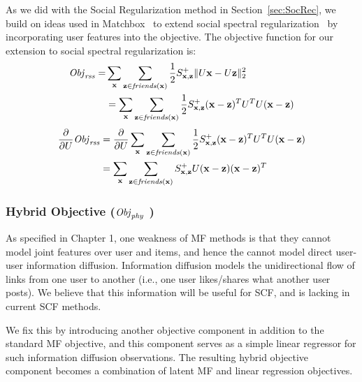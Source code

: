 As we did with the Social Regularization method in
Section~\ref{sec:SocRec}, we build on ideas used in
Matchbox~\cite{matchbox} to extend social spectral
regularization~\cite{sr,rrmf} by incorporating user features into the
objective. The objective function for our extension to social spectral
regularization is:
\begin{align}
\mathit{Obj}_{\mathit{rss}} = & \sum_{\mathbf{x}} \sum_{\mathbf{z} \in \mathit{friends}(\mathbf{x})} \frac{1}{2} S^+_{\mathbf{x},\mathbf{z}} \| U\mathbf{x} - U\mathbf{z} \|_2^2 \\
& = \sum_{\mathbf{x}} \sum_{\mathbf{z} \in \mathit{friends}(\mathbf{x})} \frac{1}{2} S^+_{\mathbf{x},\mathbf{z}} (\mathbf{x} - \mathbf{z})^T U^T U (\mathbf{x} - \mathbf{z}) \nonumber
\end{align}
\begin{align}
\frac{\partial}{\partial U} \mathit{Obj}_{\mathit{rss}} & = \frac{\partial}{\partial U} \sum_{\mathbf{x}} \sum_{\mathbf{z} \in \mathit{friends}(\mathbf{x})} \frac{1}{2} S^+_{\mathbf{x},\mathbf{z}} (\mathbf{x} - \mathbf{z})^T U^T U (\mathbf{x} - \mathbf{z}) \nonumber \\
& = \sum_{\mathbf{x}} \sum_{\mathbf{z} \in \mathit{friends}(\mathbf{x})} S^+_{\mathbf{x},\mathbf{z}} U (\mathbf{x} - \mathbf{z})(\mathbf{x} - \mathbf{z})^T \nonumber
\end{align}


\subsubsection{Hybrid Objective ($\mathit{Obj}_{\mathit{phy}}$ )}

As specified in Chapter 1, one weakness of  MF methods is that they cannot model joint features over user and items, and hence the cannot model direct user-user information diffusion. Information diffusion models the unidirectional flow of links from one user to another (i.e., one user likes/shares what another user posts). We believe that this information will be useful for SCF, and is lacking in current SCF methods.

We fix this by introducing another objective component in addition to the standard MF objective, and this component serves as a simple linear regressor for such information diffusion observations. The resulting hybrid objective component becomes a combination of latent MF and linear regression objectives.


